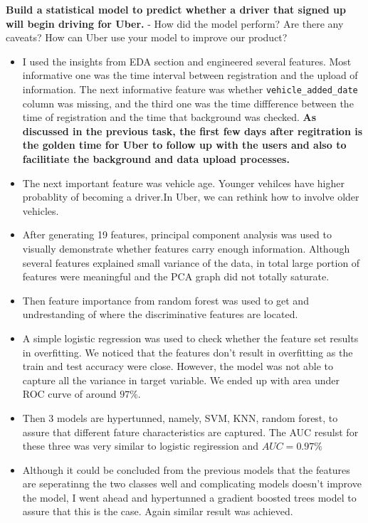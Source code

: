 \documentclass[11pt]{article}
\begin{document}
\textbf{Build a statistical model to predict whether a driver that
signed up will begin driving for Uber.} - How did the model perform? Are
there any caveats? How can Uber use your model to improve our product?

\begin{itemize}
\item
  I used the insights from EDA section and engineered several features.
  Most informative one was the time interval between registration and
  the upload of information. The next informative feature was whether
  \texttt{vehicle\_added\_date} column was missing, and the third one
  was the time diffference between the time of registration and the time
  that background was checked. \textbf{As discussed in the previous
  task, the first few days after regitration is the golden time for Uber
  to follow up with the users and also to facilitiate the background and
  data upload processes.}
\item
  The next important feature was vehicle age. Younger vehilces have
  higher probablity of becoming a driver.In Uber, we can rethink how to
  involve older vehicles.
\item
  After generating 19 features, principal component analysis was used to
  visually demonstrate whether features carry enough information.
  Although several features explained small variance of the data, in
  total large portion of features were meaningful and the PCA graph did
  not totally saturate.
\item
  Then feature importance from random forest was used to get and
  undrestanding of where the discriminative features are located.
\item
  A simple logistic regression was used to check whether the feature set
  results in overfitting. We noticed that the features don't result in
  overfitting as the train and test accuracy were close. However, the
  model was not able to capture all the variance in target variable. We
  ended up with area under ROC curve of around \(97\%\).
\item
  Then 3 models are hypertunned, namely, SVM, KNN, random forest, to
  assure that different fature characteristics are captured. The AUC
  resulst for these three was very similar to logistic regiression and
  \(AUC=0.97\%\)
\item
  Although it could be concluded from the previous models that the
  features are seperatinng the two classes well and complicating models
  doesn't improve the model, I went ahead and hypertunned a gradient
  boosted trees model to assure that this is the case. Again similar
  result was achieved.
\end{itemize}
\end{document}
